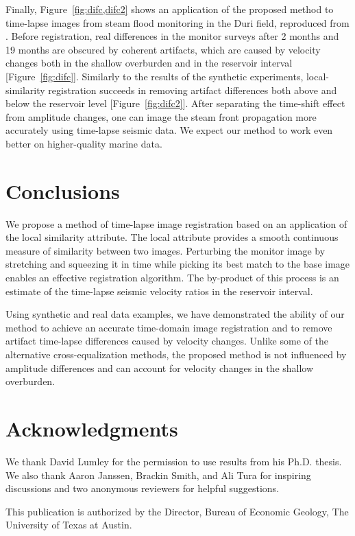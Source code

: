 Finally, Figure~\ref{fig:difc,difc2} 
shows an application of the proposed method to time-lapse images from
steam flood monitoring in the Duri field, reproduced from
\cite{Lumley.sepphd.91,SEG-1995-0203}. Before registration, real
differences in the monitor surveys after 2 months and 19 months are
obscured by coherent artifacts, which are caused by velocity changes
both in the shallow overburden and in the reservoir interval
[Figure~\ref{fig:difc}].  Similarly to the results of the synthetic
experiments, local-similarity registration succeeds in removing
artifact differences both above and below the reservoir level
[Figure~\ref{fig:difc2}]. After separating the time-shift effect from
amplitude changes, one can image the steam front propagation more
accurately using time-lapse seismic data.  We expect our method to
work even better on higher-quality marine data.


\section{Conclusions}

We propose a method of time-lapse image registration based on an
application of the local similarity attribute. The local attribute
provides a smooth continuous measure of similarity between two
images. Perturbing the monitor image by stretching and squeezing it in
time while picking its best match to the base image enables an
effective registration algorithm. The by-product of this process is an
estimate of the time-lapse seismic velocity ratios in the reservoir
interval.

Using synthetic and real data examples, we have demonstrated the
ability of our method to achieve an accurate time-domain image
registration and to remove artifact time-lapse differences caused by
velocity changes. Unlike some of the alternative cross-equalization methods,
the proposed method is not influenced by amplitude differences and can
account for velocity changes in the shallow overburden.


\section{Acknowledgments}

We thank David Lumley for the permission to use results from his
Ph.D. thesis. We also thank Aaron Janssen, Brackin Smith, and Ali
Tura for inspiring discussions and two anonymous reviewers for helpful
suggestions.

This publication is authorized by the Director, Bureau of Economic
Geology, The University of Texas at Austin.




